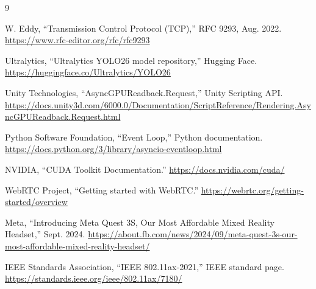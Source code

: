 \documentclass[11pt]{article}
\begin{document}
\begin{thebibliography}{9}

W. Eddy, ``Transmission Control Protocol (TCP),'' RFC 9293, Aug. 2022.
\url{https://www.rfc-editor.org/rfc/rfc9293}

Ultralytics, ``Ultralytics YOLO26 model repository,'' Hugging Face.
\url{https://huggingface.co/Ultralytics/YOLO26}

Unity Technologies, ``AsyncGPUReadback.Request,'' Unity Scripting API.
\url{https://docs.unity3d.com/6000.0/Documentation/ScriptReference/Rendering.AsyncGPUReadback.Request.html}

Python Software Foundation, ``Event Loop,'' Python documentation.
\url{https://docs.python.org/3/library/asyncio-eventloop.html}

NVIDIA, ``CUDA Toolkit Documentation.''
\url{https://docs.nvidia.com/cuda/}

WebRTC Project, ``Getting started with WebRTC.''
\url{https://webrtc.org/getting-started/overview}

Meta, ``Introducing Meta Quest 3S, Our Most Affordable Mixed Reality Headset,'' Sept. 2024.
\url{https://about.fb.com/news/2024/09/meta-quest-3s-our-most-affordable-mixed-reality-headset/}

IEEE Standards Association, ``IEEE 802.11ax-2021,'' IEEE standard page.
\url{https://standards.ieee.org/ieee/802.11ax/7180/}

\end{thebibliography}
\end{document}
